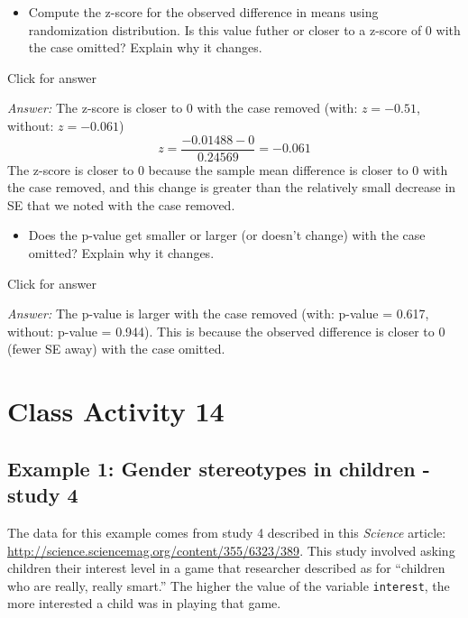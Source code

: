 \documentclass[
]{book}
\providecommand{\tightlist}{%
  \setlength{\itemsep}{0pt}\setlength{\parskip}{0pt}}
\begin{document}
\begin{itemize}
\tightlist
\item
  Compute the z-score for the observed difference in means using randomization distribution. Is this value futher or closer to a z-score of 0 with the case omitted? Explain why it changes.
\end{itemize}

Click for answer

\emph{Answer:} The z-score is closer to 0 with the case removed (with: \(z = -0.51\), without: \(z = -0.061\))
\[
z = \dfrac{-0.01488  - 0}{0.24569} = -0.061
\]
The z-score is closer to 0 because the sample mean difference is closer to 0 with the case removed, and this change is greater than the relatively small decrease in SE that we noted with the case removed.

\vspace*{.5in}

\begin{itemize}
\tightlist
\item
  Does the p-value get smaller or larger (or doesn't change) with the case omitted? Explain why it changes.
\end{itemize}

Click for answer

\emph{Answer:} The p-value is larger with the case removed (with: p-value = 0.617, without: p-value = 0.944). This is because the observed difference is closer to 0 (fewer SE away) with the case omitted.

\hypertarget{class-activity-14-1}{%
\chapter{Class Activity 14}\label{class-activity-14-1}}

\hypertarget{example-1-gender-stereotypes-in-children---study-4-1}{%
\section{Example 1: Gender stereotypes in children - study 4}\label{example-1-gender-stereotypes-in-children---study-4-1}}

The data for this example comes from study 4 described in this \emph{Science} article: \url{http://science.sciencemag.org/content/355/6323/389}. This study involved asking children their interest level in a game that researcher described as for ``children who are really, really smart.'' The higher the value of the variable \texttt{interest}, the more interested a child was in playing that game.
\end{document}
